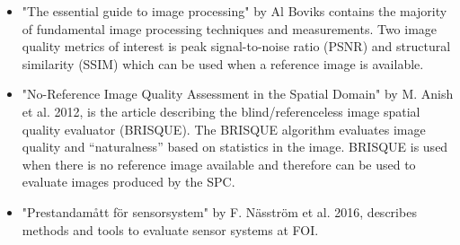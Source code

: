 \begin{itemize}

\item \cite{book:image_processing} "The essential guide to image processing" by Al Boviks contains the majority of fundamental image processing techniques and measurements. Two image quality metrics of interest is peak signal-to-noise ratio (PSNR) and structural similarity (SSIM) which can be used when a reference image is available.
    
\item \cite{article:brisque} "No-Reference Image Quality Assessment
in the Spatial Domain" by M. Anish et al. 2012, is the article describing the blind/referenceless image spatial quality evaluator (BRISQUE). The BRISQUE algorithm evaluates image quality and “naturalness” based on statistics in the image. BRISQUE is used when there is no reference image available and therefore can be used to evaluate images produced by the SPC.  
    
\item \cite{article:FOI_pres_sens} "Prestandam\aa tt f\"{o}r sensorsystem" by F. N\"{a}sstr\"{o}m et al. 2016, describes methods and tools to evaluate sensor systems at FOI. 
    
\end{itemize}





